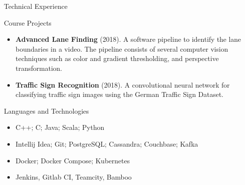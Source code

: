 \documentclass[]{cv}
\begin{document}
	\begin{cvsection}{Technical Experience}
		\begin{cvsubsection}{Course Projects}{}{}
			\begin{itemize}
				\item \textbf{Advanced Lane Finding} (2018). A software pipeline to identify the lane boundaries in a video. The pipeline consists of several computer vision techniques such as color and gradient thresholding, and perspective transformation.
				\item \textbf{Traffic Sign Recognition} (2018). A convolutional neural network for classifying traffic sign images using the German Traffic Sign Dataset.
			\end{itemize}
		\end{cvsubsection}
	\end{cvsection}

	\begin{cvsection}{Languages and Technologies}
		\begin{cvsubsection}{}{}{}
			\begin{itemize}
				\item C++; C; Java; Scala; Python
				\item Intellij Idea; Git; PostgreSQL; Cassandra; Couchbase; Kafka
				\item Docker; Docker Compose; Kubernetes
				\item Jenkins, Gitlab CI, Teamcity, Bamboo
			\end{itemize}
		\end{cvsubsection}
	\end{cvsection}
\end{document}

